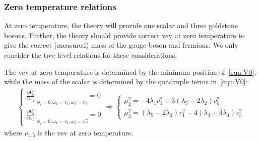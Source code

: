 \documentclass[12pt]{article}
\begin{document}
\subsubsection{Zero temperature relations}

At zero temperature, the theory will provide one scalar and three goldstone bosons. Further, the theory should provide correct vev at zero temperature to give the correct (measured) mass of the gauge boson and fermions. We only consider the tree-level relations for these considerations.

The vev at zero temperature is determined by the minimum position of~\autoref{equ:V0}, while the mass of the scalar is determined by the quadruple terms in~\autoref{equ:V0}:
\begin{align}
    \begin{cases}
    \left.\frac{\partial V_0}{\partial \omega_1}\right|_{\phi_i=0,\omega_1 = v_1,\omega_5=v_5} = 0 \\
    \left.\frac{\partial V_0}{\partial \omega_5}\right|_{\phi_i=0,\omega_1 = v_1,\omega_5=v5} = 0
    \end{cases} \Rightarrow \begin{cases}
    \mu_2^2 = -4\lambda_1v_1^2+3(\lambda_5-2\lambda_2)v_5^2\\
    \mu_3^2 = (\lambda_5-2\lambda_2)v_1^2-4(\lambda_3+3\lambda_4)v_5^2
    \end{cases}
\end{align}
where $v_{1,5}$ is the vev at zero temperature.
\end{document}

